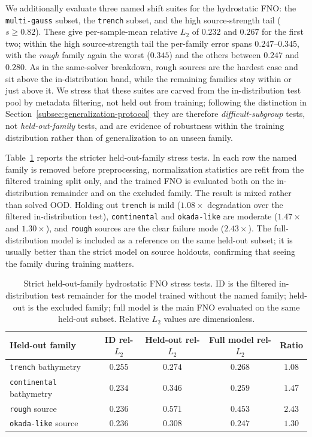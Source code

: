 We additionally evaluate three named shift suites for the hydrostatic FNO: the \texttt{multi-gauss} subset, the \texttt{trench} subset, and the high source-strength tail ($s \ge 0.82$). These give per-sample-mean relative $L_2$ of $0.232$ and $0.267$ for the first two; within the high source-strength tail the per-family error spans $0.247$--$0.345$, with the \emph{rough} family again the worst ($0.345$) and the others between $0.247$ and $0.280$. As in the same-solver breakdown, rough sources are the hardest case and sit above the in-distribution band, while the remaining families stay within or just above it. We stress that these suites are carved from the in-distribution test pool by metadata filtering, not held out from training; following the distinction in Section~\ref{subsec:generalization-protocol} they are therefore \emph{difficult-subgroup} tests, not \emph{held-out-family} tests, and are evidence of robustness within the training distribution rather than of generalization to an unseen family.

Table~\ref{tab:strict-holdout} reports the stricter held-out-family stress tests. In each row the named family is removed before preprocessing, normalization statistics are refit from the filtered training split only, and the trained FNO is evaluated both on the in-distribution remainder and on the excluded family. The result is mixed rather than solved OOD. Holding out \texttt{trench} is mild ($1.08 \times$ degradation over the filtered in-distribution test), \texttt{continental} and \texttt{okada-like} are moderate ($1.47 \times$ and $1.30 \times$), and \texttt{rough} sources are the clear failure mode ($2.43 \times$). The full-distribution model is included as a reference on the same held-out subset; it is usually better than the strict model on source holdouts, confirming that seeing the family during training matters.

\begin{table}[H]
\centering
\caption{Strict held-out-family hydrostatic FNO stress tests. ID is the filtered in-distribution test remainder for the model trained without the named family; held-out is the excluded family; full model is the main FNO evaluated on the same held-out subset. Relative $L_2$ values are dimensionless.}
\label{tab:strict-holdout}
\begin{tabular}{lcccc}
    \toprule
    Held-out family & ID rel-$L_2$ & Held-out rel-$L_2$ & Full model rel-$L_2$ & Ratio \\
    \midrule
    \texttt{trench} bathymetry      & $0.255$ & $0.274$ & $0.268$ & $1.08$ \\
    \texttt{continental} bathymetry & $0.234$ & $0.346$ & $0.259$ & $1.47$ \\
    \texttt{rough} source           & $0.236$ & $0.571$ & $0.453$ & $2.43$ \\
    \texttt{okada-like} source      & $0.236$ & $0.308$ & $0.247$ & $1.30$ \\
    \bottomrule
\end{tabular}
\end{table}


